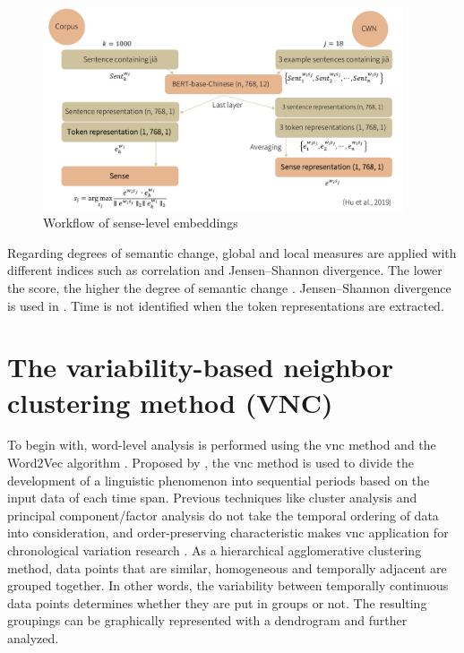 \begin{figure}[H]
  \centering
  \includegraphics[height=0.4\textheight,width=0.95\textwidth,keepaspectratio]{figures_new/from_slides/workflow_sense_level.pdf}
  \caption{Workflow of sense-level embeddings}
  \label{fig:workflow_sense_level}
\end{figure}

Regarding degrees of semantic change, global and local measures are applied with different indices such as correlation and Jensen–Shannon divergence. The lower the score, the higher the degree of semantic change \parencite{hamilton2016law}. Jensen–Shannon divergence is used in \textcite{giulianelli2019lexical}. Time is not identified when the token representations are extracted.

\section{The variability-based neighbor clustering method ({VNC})}
To begin with, word-level analysis is performed using the \gls{vnc} method \parencite{gries2012variability} and the Word2Vec algorithm \parencite{mikolov2013efficient}. Proposed by \textcite{gries2012variability}, the \gls{vnc} method is used to divide the development of a linguistic phenomenon into sequential periods based on the input data of each time span. Previous techniques like cluster analysis and principal component/factor analysis do not take the temporal ordering of data into consideration, and order-preserving characteristic makes \gls{vnc} application for chronological variation research \parencite{moisl2015cluster}. As a hierarchical agglomerative clustering method, data points that are similar, homogeneous and temporally adjacent are grouped together. In other words, the variability between temporally continuous data points determines whether they are put in groups or not. The resulting groupings can be graphically represented with a dendrogram and further analyzed.


